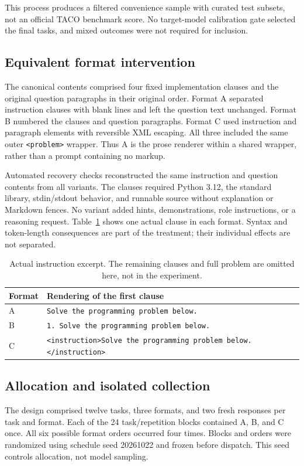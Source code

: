 \documentclass[conference,a4paper]{IEEEtran}
\begin{document}
This process produces a filtered convenience sample with curated test subsets, not an official TACO benchmark score. No target-model calibration gate selected the final tasks, and mixed outcomes were not required for inclusion.

\subsection{Equivalent format intervention}
The canonical contents comprised four fixed implementation clauses and the original question paragraphs in their original order. Format A separated instruction clauses with blank lines and left the question text unchanged. Format B numbered the clauses and question paragraphs. Format C used instruction and paragraph elements with reversible XML escaping. All three included the same outer \texttt{<problem>} wrapper. Thus A is the prose renderer within a shared wrapper, rather than a prompt containing no markup.

Automated recovery checks reconstructed the same instruction and question contents from all variants. The clauses required Python 3.12, the standard library, stdin/stdout behavior, and runnable source without explanation or Markdown fences. No variant added hints, demonstrations, role instructions, or a reasoning request. Table~\ref{tab:excerpt} shows one actual clause in each format. Syntax and token-length consequences are part of the treatment; their individual effects are not separated.

\begin{table}[t]
\caption{Actual instruction excerpt. The remaining clauses and full problem are omitted here, not in the experiment.}
\label{tab:excerpt}
\centering
\small
\begin{tabular}{@{}l>{\raggedright\arraybackslash}p{}@{}}
\toprule
Format & Rendering of the first clause\\
\midrule
A & \texttt{Solve the programming problem below.}\\
B & \texttt{1. Solve the programming problem below.}\\
C & \texttt{<instruction>Solve the programming problem below.</instruction>}\\
\bottomrule
\end{tabular}
\end{table}

\subsection{Allocation and isolated collection}
The design comprised twelve tasks, three formats, and two fresh responses per task and format. Each of the 24 task/repetition blocks contained A, B, and C once. All six possible format orders occurred four times. Blocks and orders were randomized using schedule seed 20261022 and frozen before dispatch. This seed controls allocation, not model sampling.
\end{document}
